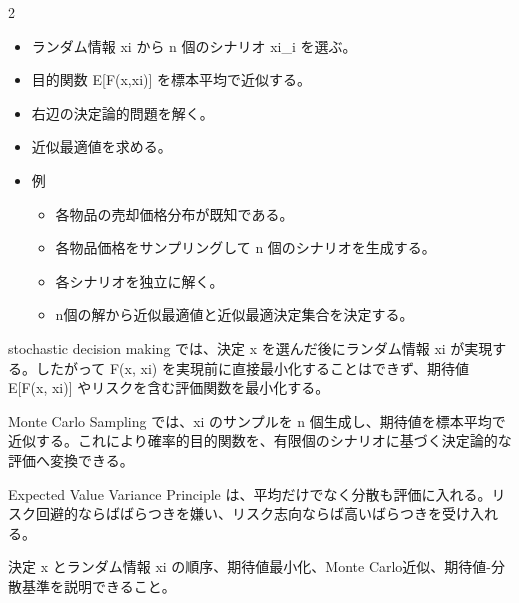 \clearpage



\vspace{1.5mm}

\begin{multicols}{2}

\footnotesize

\raggedcolumns


\begin{itemize}
\item ランダム情報 xi から n 個のシナリオ xi\_i を選ぶ。
\item 目的関数 E[F(x,xi)] を標本平均で近似する。
\item 右辺の決定論的問題を解く。
\item 近似最適値を求める。
\item 例
\begin{itemize}
\item 各物品の売却価格分布が既知である。
\item 各物品価格をサンプリングして n 個のシナリオを生成する。
\item 各シナリオを独立に解く。
\item n個の解から近似最適値と近似最適決定集合を決定する。
\end{itemize}
\end{itemize}

stochastic decision making では、決定 x を選んだ後にランダム情報 xi が実現する。したがって F(x, xi) を実現前に直接最小化することはできず、期待値 E[F(x, xi)] やリスクを含む評価関数を最小化する。\par

Monte Carlo Sampling では、xi のサンプルを n 個生成し、期待値を標本平均で近似する。これにより確率的目的関数を、有限個のシナリオに基づく決定論的な評価へ変換できる。\par

Expected Value Variance Principle は、平均だけでなく分散も評価に入れる。リスク回避的ならばばらつきを嫌い、リスク志向ならば高いばらつきを受け入れる。\par

決定 x とランダム情報 xi の順序、期待値最小化、Monte Carlo近似、期待値-分散基準を説明できること。\par


\end{multicols}
